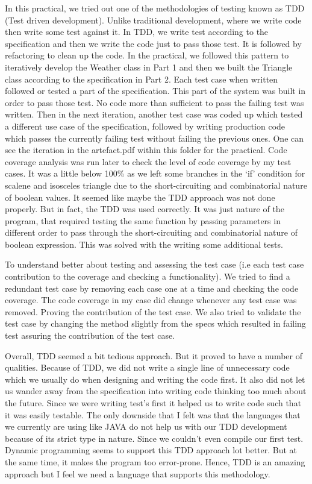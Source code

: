 In this practical, we tried out one of the methodologies of testing known as TDD (Test driven development). Unlike traditional development, where we write code then write some test against it. In TDD, we write test according to the specification and then we write the code just to pass those test. It is followed by refactoring to clean up the code. In the practical, we followed this pattern to iteratively develop the Weather class in Part 1 and then we built the Triangle class according to the specification in Part 2. Each test case when written followed or tested a part of the specification. This part of the system was built in order to pass those test. No code more than sufficient to pass the failing test was written. Then in the next iteration, another test case was coded up which tested a different use case of the specification, followed by writing production code which passes the currently failing test without failing the previous ones. One can see the iteration in the artefact.pdf within this folder for the practical. Code coverage analysis was run later to check the level of code coverage by my test cases. It was a little below 100\% as we left some branches in the `if' condition for scalene and isosceles triangle due to the short-circuiting and combinatorial nature of boolean values. It seemed like maybe the TDD approach was not done properly. But in fact, the TDD was used correctly. It was just nature of the program, that required testing the same function by passing parameters in different order to pass through the short-circuiting and combinatorial nature of boolean expression. This was solved with the writing some additional tests.

To understand better about testing and assessing the test case (i.e each test case contribution to the coverage and checking a functionality). We tried to find a redundant test case by removing each case one at a time and checking the code coverage. The code coverage in my case did change whenever any test case was removed. Proving the contribution of the test case. We also tried to validate the test case by changing the method slightly from the specs which resulted in failing test assuring the contribution of the test case.

Overall, TDD seemed a bit tedious approach. But it proved to have a number of qualities. Because of TDD, we did not write a single line of unnecessary code which we usually do when designing and writing the code first. It also did not let us wander away from the specification into writing code thinking too much about the future. Since we were writing test's first it helped us to write code such that it was easily testable. The only downside that I felt was that the languages that we currently are using like JAVA do not help us with our TDD development because of its strict type in nature. Since we couldn't even compile our first test. Dynamic programming seems to support this TDD approach lot better. But at the same time, it makes the program too error-prone. Hence, TDD is an amazing approach but I feel we need a language that supports this methodology.
